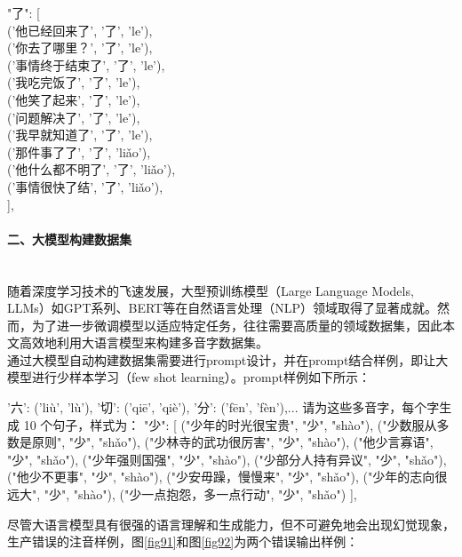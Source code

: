 \documentclass[12pt,hyperref,a4paper,UTF8]{ctexart}
\begin{document}
\begin{enumerate}
  
  \begin{tcolorbox}
    "了": [\\
      ('他已经回来了', '了', 'le'),\\
      ('你去了哪里？', '了', 'le'),\\
      ('事情终于结束了', '了', 'le'),\\
      ('我吃完饭了', '了', 'le'),\\
      ('他笑了起来', '了', 'le'),\\
      ('问题解决了', '了', 'le'),\\
      ('我早就知道了', '了', 'le'),\\
      ('那件事了了', '了', 'liǎo'),\\
      ('他什么都不明了', '了', 'liǎo'),\\
      ('事情很快了结', '了', 'liǎo'),\\
      ],
  \end{tcolorbox}
  \end{enumerate}
  \paragraph{二、大模型构建数据集}\leavevmode\\
  \indent 随着深度学习技术的飞速发展，大型预训练模型（Large Language Models, LLMs）如GPT系列、BERT等在自然语言处理（NLP）领域取得了显著成就。然而，为了进一步微调模型以适应特定任务，往往需要高质量的领域数据集，因此本文高效地利用大语言模型来构建多音字数据集。\\
  \indent 通过大模型自动构建数据集需要进行prompt设计，并在prompt结合样例，即让大模型进行少样本学习（few shot learning）。prompt样例如下所示：
  \begin{tcolorbox}
    '六': ('liù', 'lù'), '切': ('qiē', 'qiè'), '分': ('fēn', 'fèn'),... 请为这些多音字，每个字生成 10 个句子，样式为： "少": [ ("少年的时光很宝贵", "少", "shào"), ("少数服从多数是原则", "少", "shǎo"), ("少林寺的武功很厉害", "少", "shào"), ("他少言寡语", "少", "shǎo"), ("少年强则国强", "少", "shào"), ("少部分人持有异议", "少", "shǎo"), ("他少不更事", "少", "shào"), ("少安毋躁，慢慢来", "少", "shǎo"), ("少年的志向很远大", "少", "shào"), ("少一点抱怨，多一点行动", "少", "shǎo") ], 
  \end{tcolorbox}
  \indent 尽管大语言模型具有很强的语言理解和生成能力，但不可避免地会出现幻觉现象，生产错误的注音样例，图\ref{fig91}和图\ref{fig92}为两个错误输出样例：
\end{document}
